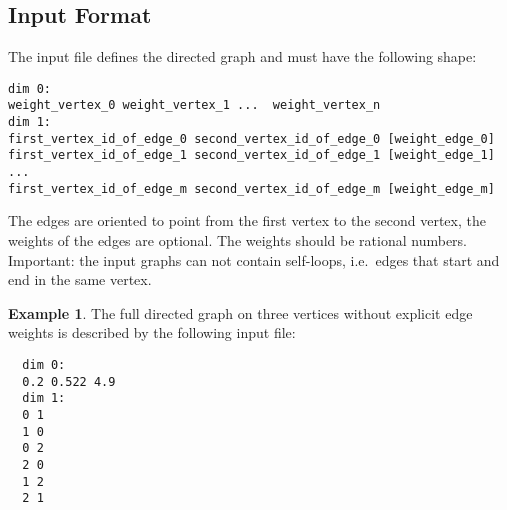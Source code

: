 \documentclass{amsart}
\theoremstyle{definition}
\newtheorem*{example*}{Example}
\begin{document}
\vspace{1em}

\newpage
\subsection{Input Format}

\noindent
The input file defines the directed graph and must have the following shape:

\vspace{.5em}
\begin{verbatim}
dim 0:
weight_vertex_0 weight_vertex_1 ...  weight_vertex_n
dim 1:
first_vertex_id_of_edge_0 second_vertex_id_of_edge_0 [weight_edge_0]
first_vertex_id_of_edge_1 second_vertex_id_of_edge_1 [weight_edge_1]
...
first_vertex_id_of_edge_m second_vertex_id_of_edge_m [weight_edge_m]
\end{verbatim}
\vspace{.5em}

\noindent
The edges are oriented to point from the first vertex to the second vertex, the weights of the edges
are optional.
The weights should be rational numbers.
Important: the input graphs can not contain self-loops, i.e.\ edges that start and end in the same vertex.

\begin{example*}
  The full directed graph on three vertices without explicit edge weights is described by the
  following input file:

  \vspace{.5em}
  \begin{verbatim}
  dim 0:
  0.2 0.522 4.9
  dim 1:
  0 1
  1 0
  0 2
  2 0
  1 2
  2 1
  \end{verbatim}
\end{example*}
\end{document}
